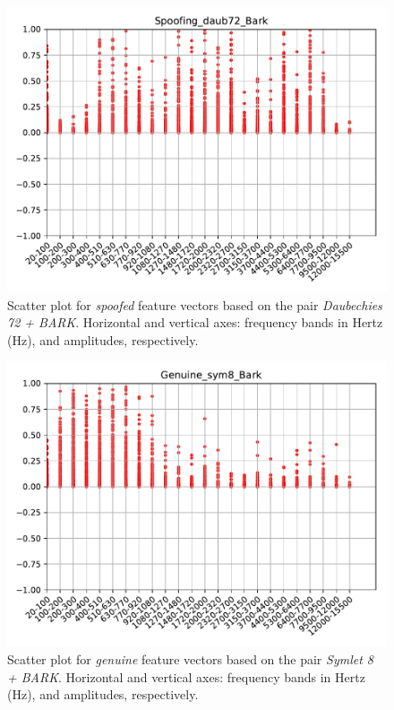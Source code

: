 		\begin{figure}[H]
			\centering
			\includegraphics[scale=.7]{images/results/barkVersusMel/Spoofing_daub72_Bark.pdf}
			\caption{Scatter plot for \textit{spoofed} feature vectors based on the pair \textit{Daubechies 72 + BARK}. Horizontal and vertical axes: frequency bands in Hertz (Hz), and amplitudes, respectively.}
			\label{fig:spoofingdaub72bark}
		\end{figure}
		\begin{figure}[H]
			\centering
			\includegraphics[scale=.7]{images/results/barkVersusMel/Genuine_sym8_Bark.pdf}
			\caption{Scatter plot for \textit{genuine} feature vectors based on the pair \textit{Symlet 8 + BARK}. Horizontal and vertical axes: frequency bands in Hertz (Hz), and amplitudes, respectively.}
			\label{fig:livesym8bark}
		\end{figure}
